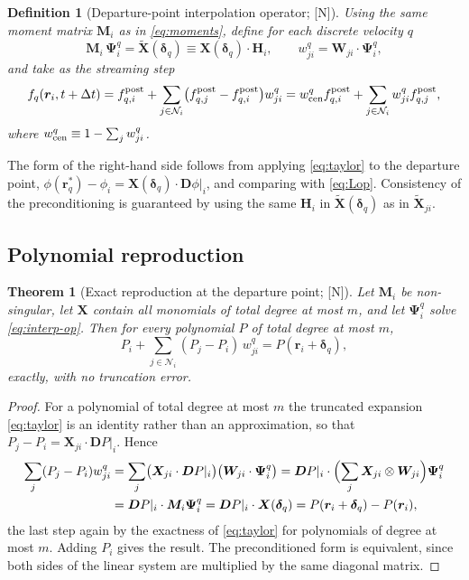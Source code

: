 \documentclass[11pt,a4paper]{article}
\newcommand{\New}{\textcolor{blue!60!black}{\textsf{[N]}}}
\newtheorem{theorem}{Theorem}
\newtheorem{definition}{Definition}
\begin{document}
\begin{definition}[Departure-point interpolation operator; \New]
\label{def:interp}
Using the same moment matrix $\bm M_i$ as in \eqref{eq:moments}, define for each
discrete velocity $q$
\begin{equation}
\bm M_i\,\bm\Psi^{q}_i=\widetilde{\bm X}(\bm\delta_q)
\equiv\bm X(\bm\delta_q)\!\cdot\!\bm H_i ,
\qquad
w^{q}_{ji}=\bm W_{ji}\cdot\bm\Psi^{q}_i ,
\label{eq:interp-op}
\end{equation}
and take as the streaming step
\begin{equation}
f_q(\bm r_i,t+\Delta t)
=f^{\rm post}_{q,i}
+\sum_{j\in\mathcal N_i}\bigl(f^{\rm post}_{q,j}-f^{\rm post}_{q,i}\bigr)w^{q}_{ji}
=w^{q}_{\rm cen}f^{\rm post}_{q,i}+\sum_{j\in\mathcal N_i}w^{q}_{ji}f^{\rm post}_{q,j},
\label{eq:stream}
\end{equation}
where $w^{q}_{\rm cen}\equiv1-\sum_{j}w^{q}_{ji}$.
\end{definition}

The form of the right-hand side follows from applying \eqref{eq:taylor} to the
departure point, $\phi(\bm r^{*}_q)-\phi_i=\bm X(\bm\delta_q)\cdot\bm D\phi|_i$, and
comparing with \eqref{eq:Lop}. Consistency of the preconditioning is guaranteed by
using the same $\bm H_i$ in $\widetilde{\bm X}(\bm\delta_q)$ as in
$\widetilde{\bm X}_{ji}$.

\subsection{Polynomial reproduction}

\begin{theorem}[Exact reproduction at the departure point; \New]
\label{thm:exact}
Let $\bm M_i$ be non-singular, let $\bm X$ contain all monomials of total degree at
most $m$, and let $\bm\Psi^{q}_i$ solve \eqref{eq:interp-op}. Then for every polynomial
$P$ of total degree at most $m$,
\begin{equation*}
P_i+\sum_{j\in\mathcal N_i}(P_j-P_i)\,w^{q}_{ji}=P(\bm r_i+\bm\delta_q),
\end{equation*}
exactly, with no truncation error.
\end{theorem}

\begin{proof}
For a polynomial of total degree at most $m$ the truncated expansion \eqref{eq:taylor}
is an identity rather than an approximation, so that $P_j-P_i=\bm X_{ji}\cdot\bm DP|_i$.
Hence
\begin{align*}
\sum_{j}(P_j-P_i)w^{q}_{ji}
&=\sum_{j}\bigl(\bm X_{ji}\cdot\bm DP|_i\bigr)\bigl(\bm W_{ji}\cdot\bm\Psi^{q}_i\bigr)
=\bm DP|_i\cdot\Bigl(\sum_{j}\bm X_{ji}\otimes\bm W_{ji}\Bigr)\bm\Psi^{q}_i\\
&=\bm DP|_i\cdot\bm M_i\bm\Psi^{q}_i
=\bm DP|_i\cdot\bm X(\bm\delta_q)
=P(\bm r_i+\bm\delta_q)-P(\bm r_i),
\end{align*}
the last step again by the exactness of \eqref{eq:taylor} for polynomials of degree at
most $m$. Adding $P_i$ gives the result. The preconditioned form is equivalent, since
both sides of the linear system are multiplied by the same diagonal matrix.
\end{proof}
\end{document}
